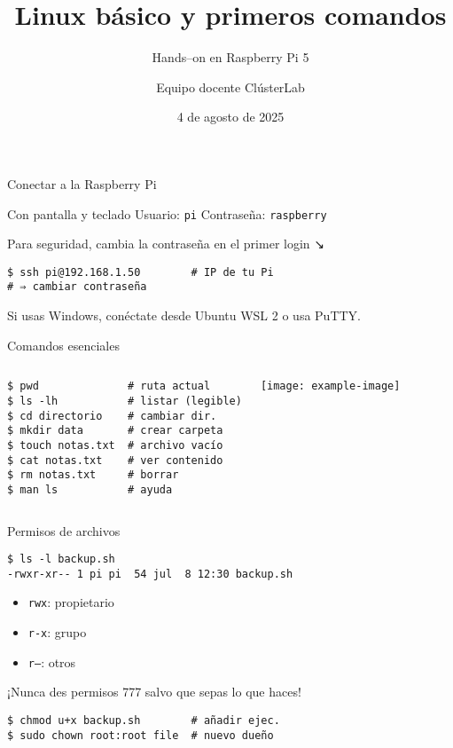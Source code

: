 \documentclass[aspectratio=169,professionalfonts]{beamer}
\title[ClústerLab • Día 1]{Linux básico y primeros comandos}
\subtitle{Hands--on en Raspberry Pi 5}
\author{Equipo docente ClústerLab}
\date{4 de agosto de 2025}
\begin{document}
\begin{frame}[plain]
  \titlepage
\end{frame}

\begin{frame}[fragile]{Conectar a la Raspberry Pi}
  \begin{block}{Con pantalla y teclado}
    Usuario: \texttt{pi} \hfill Contraseña: \texttt{raspberry}
  \end{block}
  \begin{infobox}
    Para seguridad, cambia la contraseña en el primer login ↘︎
  \end{infobox}
  \begin{verbatim}
$ ssh pi@192.168.1.50        # IP de tu Pi
# ⇒ cambiar contraseña
  \end{verbatim}
  \small Si usas Windows, conéctate desde Ubuntu WSL 2 o usa PuTTY.
\end{frame}

\begin{frame}[fragile]{Comandos esenciales}
\begin{columns}[T,onlytextwidth]
\begin{verbatim}
$ pwd              # ruta actual
$ ls -lh           # listar (legible)
$ cd directorio    # cambiar dir.
$ mkdir data       # crear carpeta
$ touch notas.txt  # archivo vacío
$ cat notas.txt    # ver contenido
$ rm notas.txt     # borrar
$ man ls           # ayuda
\end{verbatim}

\centering
\texttt{[image: example-image]}
\end{columns}
\end{frame}

\begin{frame}[fragile]{Permisos de archivos}
\begin{verbatim}
$ ls -l backup.sh
-rwxr-xr-- 1 pi pi  54 jul  8 12:30 backup.sh
\end{verbatim}

\begin{itemize}
  \item \texttt{rwx}: propietario
  \item \texttt{r-x}: grupo
  \item \texttt{r--}: otros
\end{itemize}

\begin{warnbox}
  ¡Nunca des permisos 777 salvo que sepas lo que haces!
\end{warnbox}

\begin{verbatim}
$ chmod u+x backup.sh        # añadir ejec.
$ sudo chown root:root file  # nuevo dueño
\end{verbatim}
\end{frame}
\end{document}
